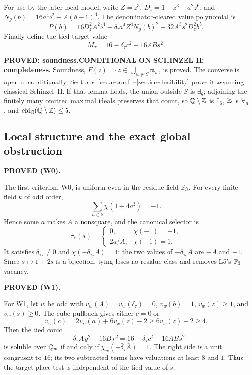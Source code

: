 For use by the later local model, write $Z=z^3$,
$D_z=1-z^3-a^2z^6$, and
$N_g(b)=16a^4b^2-A(b-1)^4$.  The denominator-cleared value polynomial is
\[
P(b)=16D_z^2A^2b^4-\delta_\tau a^4Z^4N_g(b)^2-32A^3s^2D_z^2b^5 .
\]
Finally define the tied target value
\[
M_\tau=16-\delta_\tau c^2-16ABs^2.
\]

\textbf{PROVED: soundness.}\quad\textbf{CONDITIONAL ON SCHINZEL H:
completeness.}
Soundness, $F(z)\Rightarrow z\in\bigcup_{w\notin S}\mathfrak m_w$, is
proved.  The converse is open unconditionally; Sections~\ref{sec:record}
--\ref{sec:irreducibility} prove it assuming classical Schinzel~H.
If that lemma holds, the union outside $S$ is $\exists_6$; adjoining the
finitely many omitted maximal ideals preserves that count, so
$\mathbb{Q}\setminus\mathbb{Z}$ is $\exists_6$, $\mathbb{Z}$ is $\forall_6$, and
$\operatorname{efd}_{\mathbb{Q}}(\mathbb{Q}\setminus\mathbb{Z})\leq5$.

\subsection{Local structure and the exact global obstruction}

\textbf{PROVED (W0).}

The first criterion, W0, is uniform even in the residue field $\mathbb{F}_3$.
For every finite field $k$ of odd order,
\[
\sum_{a\in k}\chi(1+4a^2)=-1.
\]
Hence some $a$ makes $A$ a nonsquare, and the canonical selector is
\[
\tau_*(a)=
\begin{cases}
0,&\chi(-1)=-1,\\[2pt]
2a/A,&\chi(-1)=1.
\end{cases}
\]
It satisfies $\delta_{\tau_*}\neq0$ and
$\chi(-\delta_{\tau_*}A)=1$: the two values of
$-\delta_{\tau_*}A$ are $-A$ and $-1$.  Since $s\mapsto1+2s$ is a
bijection, tying loses no residue class and removes L5's $\mathbb{F}_3$ vacancy.

\textbf{PROVED (W1).}

For W1, let $w$ be odd with
$v_w(A)=v_w(\delta_\tau)=0$, $v_w(b)=1$, $v_w(z)\geq1$, and
$v_w(s)\geq0$.  The cube pullback gives either $c=0$ or
\[
v_w(c)=2v_w(a)+6v_w(z)-2\geq6v_w(z)-2\geq4.
\]
Then the tied conic
\[
-\delta_\tau A\,y^2-16B\,r^2=16-\delta_\tau c^2-16ABs^2
\]
is soluble over $\mathbb{Q}_w$ if and only if
$\chi_w(-\bar\delta_\tau\bar A)=1$.  The right side is a unit congruent
to $16$; its two subtracted terms have valuations at least $8$ and $1$.
Thus the target-place test is independent of the tied value of $s$.

